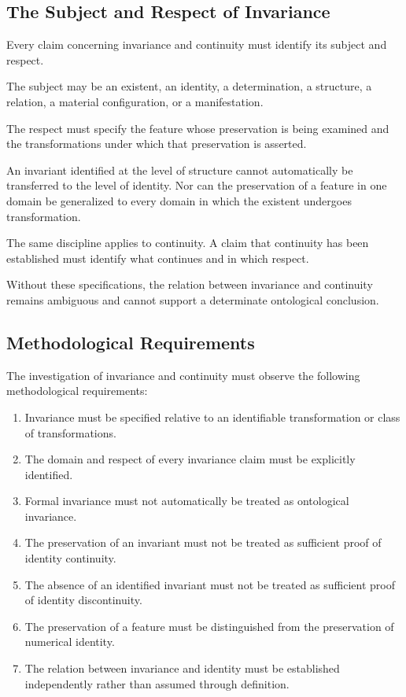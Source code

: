 \subsection{The Subject and Respect of Invariance}

Every claim concerning invariance and continuity
must identify its subject and respect.

The subject may be an existent, an identity, a
determination, a structure, a relation, a material
configuration, or a manifestation.

The respect must specify the feature whose preservation
is being examined and the transformations under
which that preservation is asserted.

An invariant identified at the level of structure
cannot automatically be transferred to the level
of identity. Nor can the preservation of a feature
in one domain be generalized to every domain in
which the existent undergoes transformation.

The same discipline applies to continuity. A claim
that continuity has been established must identify
what continues and in which respect.

Without these specifications, the relation between
invariance and continuity remains ambiguous and
cannot support a determinate ontological conclusion.

\subsection{Methodological Requirements}

The investigation of invariance and continuity must
observe the following methodological requirements:

\begin{enumerate}
    \item Invariance must be specified relative to
    an identifiable transformation or class of
    transformations.
    \item The domain and respect of every invariance
    claim must be explicitly identified.
    \item Formal invariance must not automatically
    be treated as ontological invariance.
    \item The preservation of an invariant must not
    be treated as sufficient proof of identity continuity.
    \item The absence of an identified invariant must
    not be treated as sufficient proof of identity
    discontinuity.
    \item The preservation of a feature must be
    distinguished from the preservation of numerical
    identity.
    \item The relation between invariance and identity
    must be established independently rather than
    assumed through definition.
\end{enumerate}

